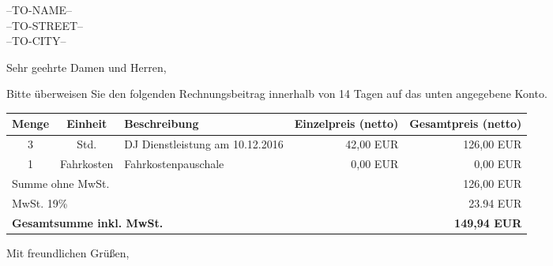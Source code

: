 \documentclass
  [fontsize=11pt,%
   paper=a4,%
   headsepline=off,%
   parskip=half,%
   fromalign=right,%
   fromphone=on,%
   fromrule=aftername,%
   fromfax=off,%
   fromemail=on,%
   fromurl=off,%
   fromlogo=on,%
   addrfield=on,%
   backaddress=on,%
   subject=beforeopening,%
   locfield=narrow,%
   foldmarks=on,%
   numericaldate=off,%
   refline=narrow,%
   firstfoot=on,%
   draft=off%
]{scrlttr2}
\begin{document}
\begin{letter}
{
--TO-NAME--\\
--TO-STREET--\\
\vspace{4mm}
--TO-CITY--\\
}
\opening{Sehr geehrte Damen und Herren,}

Bitte überweisen Sie den folgenden Rechnungsbeitrag innerhalb von 14 Tagen auf das unten angegebene Konto.

\vspace{5pt}
\begin{tabularx}{\textwidth}{ccXrr}
\hline
\tiny {Menge} & \tiny {Einheit} & \tiny {Beschreibung} & \tiny {Einzelpreis (netto)} & \tiny {Gesamtpreis (netto)} \\ \hline
 3 & Std. & DJ Dienstleistung am 10.12.2016 & \multicolumn{1}{r}{42,00 EUR} & \multicolumn{1}{r}{126,00 EUR} \\ \hline
 1 & Fahrkosten & Fahrkostenpauschale & \multicolumn{1}{r}{0,00 EUR} & \multicolumn{1}{r}{0,00 EUR} \\ \hline \hline
\multicolumn{ 4}{l}{\small{Summe ohne MwSt.}} & 126,00 EUR \\ \hline
\multicolumn{ 4}{l}{\small{MwSt. 19\% }} & 23.94 EUR \\ \hline \hline
\multicolumn{ 4}{l}{ \textbf{Gesamtsumme inkl. MwSt.} } & \textbf{149,94 EUR} \\ \hline
\end{tabularx}

\closing{Mit freundlichen Grüßen,}
\end{letter}
\end{document}
